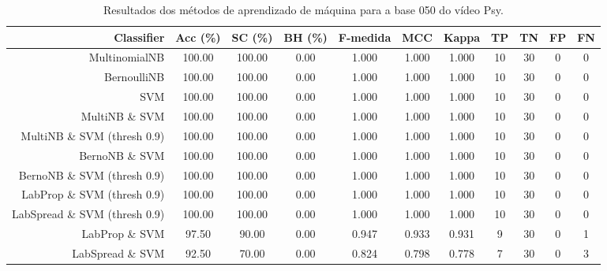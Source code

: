 \begin{table}[!htb]
\centering
\caption{Resultados dos métodos de aprendizado de máquina para a base 050 do vídeo Psy.}
\label{tab:Psy-050}
\begin{tabular}{r|c|c|c|c|c|c|c|c|c|c}
\hline\hline
Classifier & Acc (\%) & SC (\%) & BH (\%) & F-medida & MCC & Kappa & TP & TN & FP & FN \\ \hline
MultinomialNB & 100.00 & 100.00 & 0.00 & 1.000 & 1.000 & 1.000 & 10 & 30 & 0 & 0 \\ 
BernoulliNB & 100.00 & 100.00 & 0.00 & 1.000 & 1.000 & 1.000 & 10 & 30 & 0 & 0 \\ 
SVM & 100.00 & 100.00 & 0.00 & 1.000 & 1.000 & 1.000 & 10 & 30 & 0 & 0 \\ 
MultiNB \& SVM & 100.00 & 100.00 & 0.00 & 1.000 & 1.000 & 1.000 & 10 & 30 & 0 & 0 \\ 
MultiNB \& SVM (thresh 0.9) & 100.00 & 100.00 & 0.00 & 1.000 & 1.000 & 1.000 & 10 & 30 & 0 & 0 \\ 
BernoNB \& SVM & 100.00 & 100.00 & 0.00 & 1.000 & 1.000 & 1.000 & 10 & 30 & 0 & 0 \\ 
BernoNB \& SVM (thresh 0.9) & 100.00 & 100.00 & 0.00 & 1.000 & 1.000 & 1.000 & 10 & 30 & 0 & 0 \\ 
LabProp \& SVM (thresh 0.9) & 100.00 & 100.00 & 0.00 & 1.000 & 1.000 & 1.000 & 10 & 30 & 0 & 0 \\ 
LabSpread \& SVM (thresh 0.9) & 100.00 & 100.00 & 0.00 & 1.000 & 1.000 & 1.000 & 10 & 30 & 0 & 0 \\ 
LabProp \& SVM & 97.50 & 90.00 & 0.00 & 0.947 & 0.933 & 0.931 & 9 & 30 & 0 & 1 \\ 
LabSpread \& SVM & 92.50 & 70.00 & 0.00 & 0.824 & 0.798 & 0.778 & 7 & 30 & 0 & 3 \\ 
\hline\hline
\end{tabular}
\end{table}
